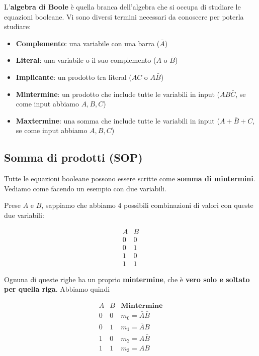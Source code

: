 \documentclass[11pt, a4paper, titlepage, oneside]{scrbook}
\begin{document}
\begin{Definizione}
\label{def-algebra-boole}
L'\textbf{algebra di Boole} è quella branca dell'algebra che si occupa di studiare le equazioni booleane. Vi sono diversi termini necessari da conoscere per poterla studiare:
\begin{itemize}
    \item \textbf{Complemento}: una variabile con una barra ($\bar{A}$)
    \item \textbf{Literal}: una variabile o il suo complemento ($A$ o $\bar{B}$)
    \item \textbf{Implicante}: un prodotto tra literal ($AC$ o $A \bar{B}$)
    \item \textbf{Mintermine}: un prodotto che include tutte le variabili in input ($AB\bar{C}$, se come input abbiamo $A,B,C$)
    \item \textbf{Maxtermine}: una somma che include tutte le variabili in input ($A + \bar{B} + C$, se come input abbiamo $A,B,C$)
\end{itemize}
\end{Definizione}

\subsection{Somma di prodotti (SOP)}

Tutte le equazioni booleane possono essere scritte come \textbf{somma di mintermini}. Vediamo come facendo un esempio con due variabili.

Prese $A$ e $B$, sappiamo che abbiamo 4 possibili combinazioni di valori con queste due variabili:

\[
\begin{array}{cc}
A & B \\
\hline
0 & 0  \\
0 & 1  \\
1 & 0  \\
1 & 1 
\end{array}
\]

Ognuna di queste righe ha un proprio \textbf{mintermine}, che è \textbf{vero solo e soltato per quella riga}. Abbiamo quindi

\[
\begin{array}{cc|c}
A & B & \textbf{Mintermine} \\
\hline
0 & 0 & m_0 = \bar{A} \bar{B} \\
0 & 1 & m_1 = \bar{A} B \\
1 & 0 & m_2 = A \bar{B} \\
1 & 1 & m_3 = A B
\end{array}
\]
\end{document}
